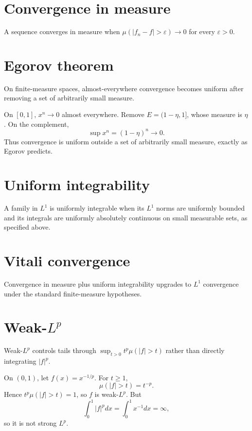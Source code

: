 \section{Convergence in measure}
A sequence converges in measure when $\mu(|f_n-f|>\varepsilon)\to0$ for every $\varepsilon>0$.

\section{Egorov theorem}
On finite-measure spaces, almost-everywhere convergence becomes uniform after removing a set of arbitrarily small measure.


\begin{example}\label{ex:iii08-expand-01}
On \([0,1]\), \(x^n\to0\) almost everywhere. Remove
\(E=(1-\eta,1]\), whose measure is \(\eta\). On the complement,
\[
\sup x^n=(1-\eta)^n\to0.
\]
Thus convergence is uniform outside a set of arbitrarily small measure, exactly
as Egorov predicts.
\end{example}
\section{Uniform integrability}
A family in $L^1$ is uniformly integrable when its $L^1$ norms are uniformly bounded and its integrals are uniformly absolutely continuous on small measurable sets, as specified above.

\section{Vitali convergence}
Convergence in measure plus uniform integrability upgrades to $L^1$ convergence under the standard finite-measure hypotheses.

\section{Weak-$L^p$}
Weak-$L^p$ controls tails through $\sup_{t>0}t^p\mu(|f|>t)$ rather than directly integrating $|f|^p$.


\begin{example}\label{ex:iii08-expand-02}
On \((0,1)\), let \(f(x)=x^{-1/p}\). For \(t\ge1\),
\[
\mu(|f|>t)=t^{-p}.
\]
Hence \(t^p\mu(|f|>t)=1\), so \(f\) is weak-\(L^p\). But
\[
\int_0^1|f|^pdx=\int_0^1x^{-1}dx=\infty,
\]
so it is not strong \(L^p\).
\end{example}
